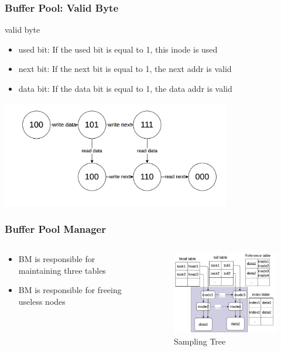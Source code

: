\documentclass[notheorems, aspectratio=54]{beamer}
\begin{document}
\begin{frame}
    \frametitle{Buffer Pool: Valid Byte}
    \begin{block} {valid byte}
        \begin{itemize}
            \item used bit: If the used bit is equal to 1, this inode is used
            \item next bit: If the next bit is equal to 1, the next addr is valid
            \item data bit: If the data bit is equal to 1, the data addr is valid
        \end{itemize}
    \end{block}
    \centering
    \includegraphics[width=10cm]{global_img_dir/automata.png}
\end{frame}

\begin{frame}
    \frametitle{Buffer Pool Manager}
    \begin{columns}
        \begin{column}{0.38\textwidth}
            \begin{itemize}
                \item BM is responsible for maintaining three tables
                \item BM is responsible for freeing useless nodes
            \end{itemize}
        \end{column}
        \begin{column}{0.58\textwidth}
            \begin{figure}
                \centering
                \includegraphics[width=7cm]{global_img_dir/bm.png}
                \caption{Sampling Tree}
            \end{figure}
        \end{column}
    \end{columns}
\end{frame}
\end{document}

